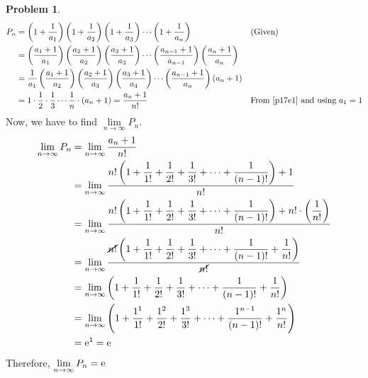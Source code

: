 \documentclass[14]{article}
\theoremstyle{definition}
\newtheorem{prob}{Problem}
\begin{document}
\begin{prob}
\begin{align*}
P_n &= \left(1 + \dfrac1{a_1}\right)\left(1 + \dfrac1{a_2}\right)\left(1 + \dfrac1{a_3}\right)\cdots\left(1 + \dfrac1{a_n}\right) && \text{(Given)}\\
&= \foreach \x in {1, 2, 3} {\left( \dfrac{a_{\x} + 1}{a_{\x}} \right)} \cdots \left( \dfrac{a_{n-1} + 1}{a_{n-1}} \right)\left( \dfrac{a_{n} + 1}{a_{n}} \right)\\
&= \dfrac1{a_1} \foreach \x in {1, 2, 3}{\left(\dfrac{a_{\x} + 1}{a_{{\pgfmathparse{int(\x + 1}\pgfmathresult}}}\right)} \cdots \left(\dfrac{a_{n-1} + 1}{a_n}\right)\left(a_n + 1\right)\\
&= 1 \cdot \dfrac12 \cdot \dfrac13 \cdots \dfrac1{n} \cdot (a_n + 1) = \dfrac{a_n + 1}{n!} && \text{From \eqref{p17e1} and using $a_1 = 1$}
\end{align*}
Now, we have to find $\lim\limits_{n \to \infty} P_n$.
\begin{align*}
\lim\limits_{n \to \infty} P_n &= \lim_{n \to \infty} \dfrac{a_n + 1}{n!}\\
&= \lim_{n \to \infty} \dfrac{n! \left( 1 + \dfrac1{1!} + \dfrac1{2!} + \dfrac1{3!} + \cdots + \dfrac1{(n-1)!} \right) + 1}{n!}\\
&= \lim_{n \to \infty} \dfrac{n! \left( 1 + \dfrac1{1!} + \dfrac1{2!} + \dfrac1{3!} + \cdots + \dfrac1{(n-1)!} \right) + n!\cdot \left(\dfrac1{n!}\right)}{n!}\\
&= \lim_{n \to \infty} \dfrac{\cancel{n!} \left( 1 + \dfrac1{1!} + \dfrac1{2!} + \dfrac1{3!} + \cdots + \dfrac1{(n-1)!} + \dfrac1{n!} \right)}{\cancel{n!}}\\
&= \lim_{n \to \infty}\left( 1 + \dfrac1{1!} + \dfrac1{2!} + \dfrac1{3!} + \cdots + \dfrac1{(n-1)!} + \dfrac1{n!} \right)\\
&= \lim_{n \to \infty}\left( 1 + \dfrac{1^1}{1!} + \dfrac{1^2}{2!} + \dfrac{1^3}{3!} + \cdots + \dfrac{1^{n-1}}{(n-1)!} + \dfrac{1^n}{n!} \right)\\
&= {\rm e}^1 = {\rm e}
\end{align*}
Therefore, $\lim\limits_{n \to \infty} P_n = {\rm e}$
\end{prob}
\end{document}
